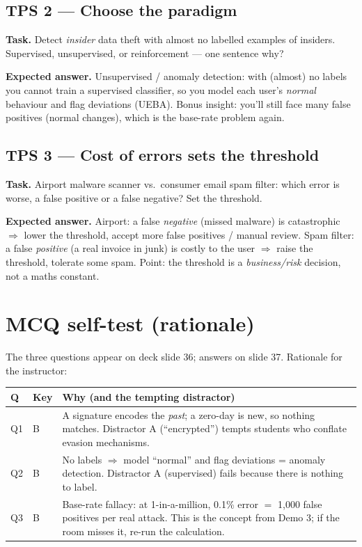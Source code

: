 \documentclass[11pt,a4paper]{article}
\begin{document}
\subsection*{TPS 2 --- Choose the paradigm}
\begin{think}
\textbf{Task.} Detect \emph{insider} data theft with almost no labelled examples
of insiders. Supervised, unsupervised, or reinforcement --- one sentence why?
\end{think}
\textbf{Expected answer.} Unsupervised / anomaly detection: with (almost) no
labels you cannot train a supervised classifier, so you model each user's
\emph{normal} behaviour and flag deviations (UEBA). Bonus insight: you'll still
face many false positives (normal changes), which is the base-rate problem again.

\subsection*{TPS 3 --- Cost of errors sets the threshold}
\begin{think}
\textbf{Task.} Airport malware scanner vs.\ consumer email spam filter: which
error is worse, a false positive or a false negative? Set the threshold.
\end{think}
\textbf{Expected answer.} Airport: a false \emph{negative} (missed malware) is
catastrophic $\Rightarrow$ lower the threshold, accept more false positives /
manual review. Spam filter: a false \emph{positive} (a real invoice in junk) is
costly to the user $\Rightarrow$ raise the threshold, tolerate some spam. Point:
the threshold is a \emph{business/risk} decision, not a maths constant.

\section{MCQ self-test (rationale)}
The three questions appear on deck slide 36; answers on slide 37. Rationale for
the instructor:

\renewcommand{\arraystretch}{1.3}
\begin{tabular}{@{}p{0.7cm} p{1.1cm} p{12.8cm}@{}}
\toprule
\textbf{Q} & \textbf{Key} & \textbf{Why (and the tempting distractor)}\\
\midrule
Q1 & B & A signature encodes the \emph{past}; a zero-day is new, so nothing
matches. Distractor A (``encrypted'') tempts students who conflate evasion
mechanisms.\\
Q2 & B & No labels $\Rightarrow$ model ``normal'' and flag deviations = anomaly
detection. Distractor A (supervised) fails because there is nothing to label.\\
Q3 & B & Base-rate fallacy: at 1-in-a-million, 0.1\% error $=$ 1{,}000 false
positives per real attack. This is the concept from Demo 3; if the room misses it,
re-run the calculation.\\
\bottomrule
\end{tabular}
\end{document}
